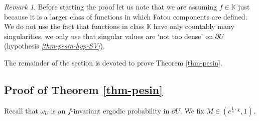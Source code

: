 \documentclass[11pt]{article}
\theoremstyle{definition}
\theoremstyle{remark}
\newtheorem{remark}[thm]{Remark}
\newcounter{main}
\theoremstyle{plain}
\begin{document}
\begin{remark}\label{rmk-pesin-also-for-inner}
	Before starting the proof let us note that we are assuming $ f\in\mathbb{K} $ just because it is a larger class of functions in which Fatou components are defined. We do not use the fact that functions in class $ \mathbb{K}  $ have only countably many singularities, we only use that singular values are `not too dense'  on $ \partial U $ (hypothesis {\em \ref{thm-pesin-hyp-SV}}). 
\end{remark}

The remainder of the section is devoted to prove Theorem \ref{thm-pesin}.

\subsection{Proof of Theorem \ref{thm-pesin}}

Recall that $ \omega_U $ is an $ f $-invariant ergodic probability in $ \partial U $. 		
We fix $ M\in (e^{\frac{1}{4}\cdot\chi}, 1) $.
\end{document}
